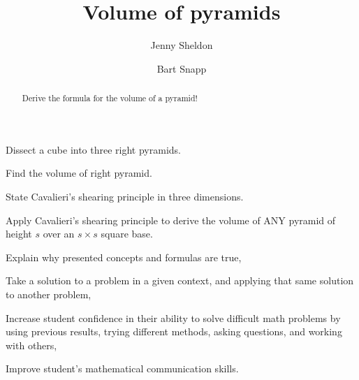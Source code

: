 \documentclass[nooutcomes,noauthor,handout]{ximera}
\title{Volume of pyramids}
\author{Jenny Sheldon \and Bart Snapp}
\begin{document}
\begin{abstract}
  Derive the formula for the volume of a pyramid!
\end{abstract}
\maketitle


\begin{listOutcomes}
\item Dissect a cube into three right pyramids.
\item Find the volume of right pyramid.
\item State Cavalieri's shearing principle in three dimensions.
\item Apply Cavalieri's shearing principle to derive the volume of ANY pyramid
  of height $s$ over an $s\times s$ square base.
\end{listOutcomes}

\begin{listObjectives}
 \item Explain why presented concepts and formulas are true,
 \item Take a solution to a problem in a given context, and applying that same solution to another problem,
 \item Increase student confidence in their ability to solve difficult math problems by using previous results, trying different methods, asking questions, and working with others,
 \item Improve student’s mathematical communication skills.

\end{listObjectives}

\end{document}
